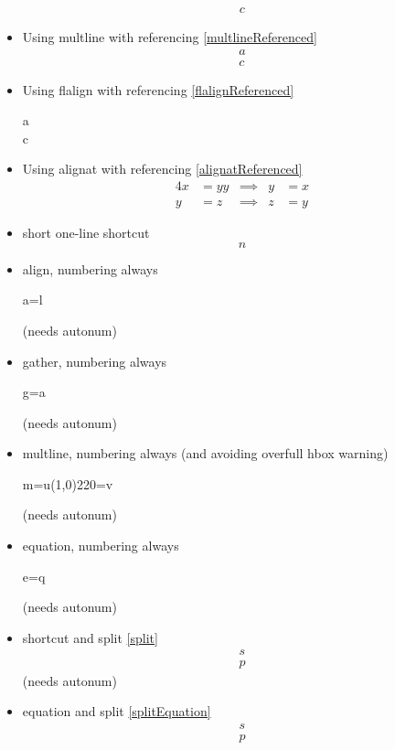 \documentclass{article}
\begin{document}
\begin{itemize}
\begin{multline}
				c\label{multlineUnreferenced}
			\end{multline}
		\item Using multline with referencing \ref{multlineReferenced}
			\begin{multline}
				a\\
				c\label{multlineReferenced}
			\end{multline}
		\item Using flalign with referencing \ref{flalignReferenced}
			\begin{flalign}
				a\\
				c\label{flalignReferenced}
			\end{flalign}
		\item Using alignat with referencing \ref{alignatReferenced}
			\begin{alignat}{4}
				x &= yy & \implies & y &= x \label{alignatUnreferenced}\\
				y &= z & \implies & z &= y \label{alignatReferenced}
			\end{alignat}
		\item short one-line shortcut \[n\]
		\item align, numbering always \begin{align+} a=l \end{align+} (needs autonum)
		\item gather, numbering always \begin{gather+} g=a \end{gather+} (needs autonum)
		\item multline, numbering always (and avoiding overfull hbox warning) \begin{multline+} m=u\line(1,0){220}=v \end{multline+} (needs autonum)
		\item equation, numbering always \begin{equation+} e=q \end{equation+} (needs autonum)
		\item shortcut and split \ref{split} \[ \label{split}\begin{split} s \\ p \end{split} \] (needs autonum)
		\item equation and split \ref{splitEquation} \begin{equation} \label{splitEquation}\begin{split} s \\ p \end{split} \end{equation}

\end{itemize}
\end{document}

